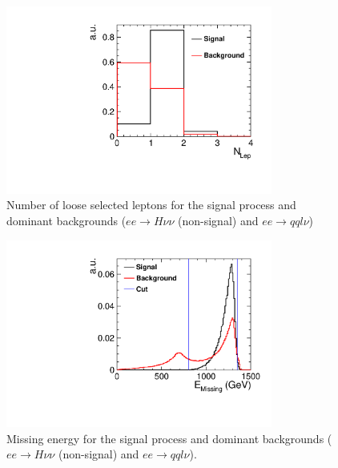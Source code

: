 \begin{figure}
  \centering
  \includegraphics[width=0.78\textwidth,keepaspectratio]{HiggsAnalysis/figures/nLep_PreSelection}
  \caption[Number of reconstructed loose selected lepton for signal and background events]{Number of loose selected leptons for the signal process and dominant backgrounds ($ee\rightarrow H\nu\nu$ (non-signal) and $ee\rightarrow qql\nu$)}
  \label{fig:nLepPreSel}
\end{figure}

\begin{figure}
  \centering
  \includegraphics[width=0.78\textwidth,keepaspectratio]{HiggsAnalysis/figures/EMissing_PreSelection}
  \caption[Missing energy of signal and background events]{Missing energy for the signal process and dominant backgrounds ($ee\rightarrow H\nu\nu$ (non-signal) and $ee\rightarrow qql\nu$).}
  \label{fig:EMissPreSel}
\end{figure}

